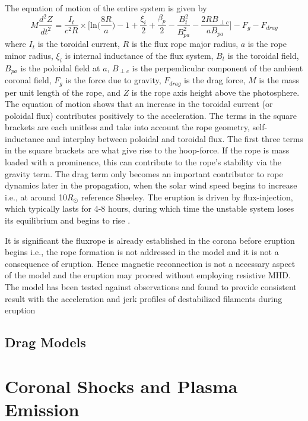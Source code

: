 The equation of motion of the entire system is given by
\begin{equation}
M\frac{d^2Z}{dt^2} = \frac{I_t}{c^2R}\times\bigg[ \mathrm{ln}\bigg(\frac{8R}{a}\bigg) -1+ \frac{\xi_i}{2} + \frac{\beta_p}{2} -\frac{B^2_t}{B^2_{pa}}  -\frac{2RB_{\perp c}}{aB_{pa}} \bigg] - F_g - F_{drag}
\end{equation}
where $I_t$ is the toroidal current, $R$ is the flux rope major radius, $a$ is the rope minor radius, $\xi_i$ is internal inductance of the flux system, $B_t$ is the toroidal field, $B_{pa}$ is the poloidal field at $a$, $B_{\perp c}$ is the perpendicular component of the ambient coronal field, $F_g$ is the force due to gravity, $F_{drag}$ is the drag force, $M$ is the mass per unit length of the rope, and $Z$ is the rope axis height above the photosphere. The equation of motion shows that an increase in the toroidal current (or poloidal flux) contributes positively to the acceleration. The terms in the square brackets are each unitless and take into account the rope geometry, self-inductance and interplay between poloidal and toroidal flux. The first three terms in the square brackets are what give rise to the hoop-force. If the rope is mass loaded with a prominence, this can contribute to the rope's stability via the gravity term. The drag term only becomes an important contributor to rope dynamics later in the propagation, when the solar wind speed begins to increase i.e., at around 10$R_{\odot}$ reference Sheeley. The eruption is driven by flux-injection, which typically lasts for 4-8 hours, during which time the unstable system loses its equilibrium and begins to rise \citet{krall2001}.

It is significant the fluxrope is already established in the corona before eruption begins i.e., the rope formation is not addressed in the model and it is not a consequence of eruption. Hence magnetic reconnection is not a necessary aspect of the model and the eruption may proceed without employing resistive MHD. The model has been tested against observations and found to provide consistent result with the acceleration and jerk profiles of destabilized filaments during eruption \citep{schrijver2008}


\subsection{Drag Models}\label{sec:23}


\section{Coronal Shocks and Plasma Emission}\label{sec:3}

